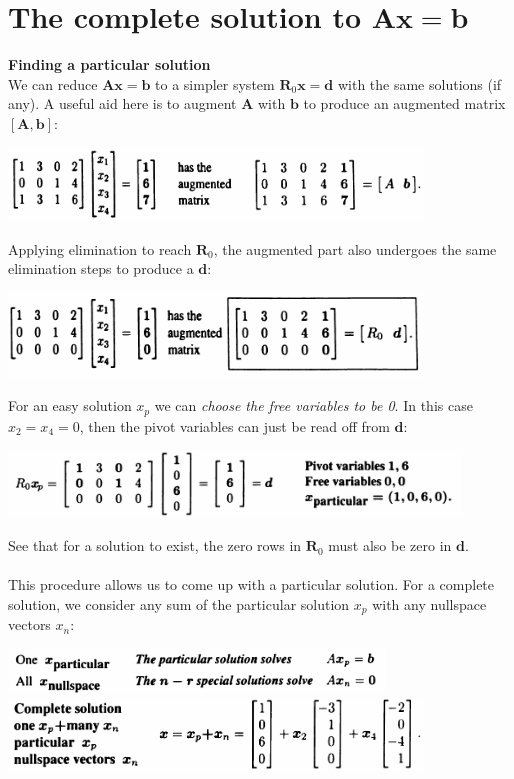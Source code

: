 \documentclass{report}
\begin{document}
\section{The complete solution to $\bm{Ax}=\bm b$}
\textbf{Finding a particular solution}\\
We can reduce $\bm{Ax}=\bm b$ to a simpler system $\bm R_0\bm x=\bm d$ with the same solutions (if any). A useful aid here is to augment 
$\bm A$ with $\bm b$ to produce an augmented matrix $[\bm A,\bm b]$:
\begin{center}
\includegraphics[width=11cm]{35}
\end{center}
Applying elimination to reach $\bm R_0$, the augmented part also undergoes the same elimination steps to produce a $\bm d$:
\begin{center}
\includegraphics[width=11cm]{36}
\end{center}
For an easy solution $x_p$ we can \textit{choose the free variables to be 0}. In this case $x_2=x_4=0$, then the pivot variables can just be read off from $\bm d$:
\begin{center}
\includegraphics[width=12cm]{37}
\end{center}
See that for a solution to exist, the zero rows in $\bm R_0$ must also be zero in $\bm d$.\\
\vspace{1mm}\\
This procedure allows us to come up with a particular solution. For a complete solution, we consider any sum of the particular solution $x_p$ with any nullspace 
vectors $x_n$:
\begin{center}
\includegraphics[width=10cm]{38}\\
\includegraphics[width=11cm]{39}
\end{center}
\end{document}
